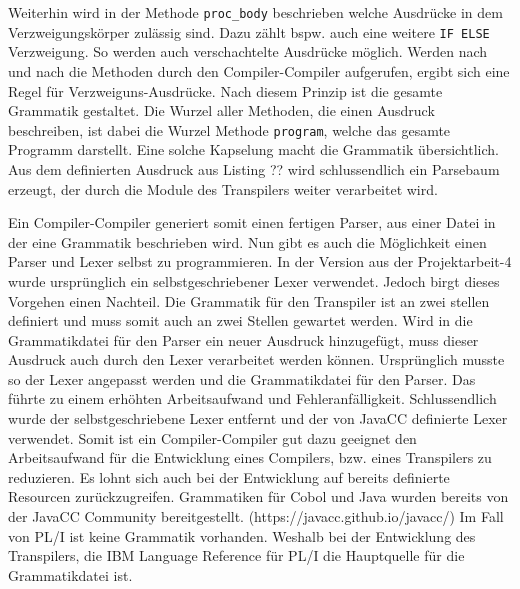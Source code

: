 Weiterhin wird in der Methode \verb+proc_body+ beschrieben welche Ausdrücke in dem Verzweigungskörper zulässig sind. Dazu zählt bspw. auch eine weitere \verb+IF ELSE+ Verzweigung. So werden auch verschachtelte Ausdrücke möglich.
Werden nach und nach die Methoden durch den Compiler-Compiler aufgerufen, ergibt sich eine Regel für Verzweiguns-Ausdrücke. Nach diesem Prinzip ist die gesamte Grammatik gestaltet. 
Die Wurzel aller Methoden, die einen Ausdruck beschreiben, ist dabei die Wurzel Methode \verb+program+, welche das gesamte Programm darstellt. Eine solche Kapselung macht die Grammatik übersichtlich.
Aus dem definierten Ausdruck aus Listing ?? wird schlussendlich ein Parsebaum erzeugt, der durch die Module des Transpilers weiter verarbeitet wird.


Ein Compiler-Compiler generiert somit einen fertigen Parser, aus einer Datei in der eine Grammatik beschrieben wird. Nun gibt es auch die Möglichkeit einen Parser und Lexer selbst zu programmieren. In der Version aus der Projektarbeit-4 wurde ursprünglich ein selbstgeschriebener Lexer verwendet.
Jedoch birgt dieses Vorgehen einen Nachteil. Die Grammatik für den Transpiler ist an zwei stellen definiert und muss somit auch an zwei Stellen gewartet werden.
Wird in die Grammatikdatei für den Parser ein neuer Ausdruck hinzugefügt, muss dieser Ausdruck auch durch den Lexer verarbeitet werden können.
Ursprünglich musste so der Lexer angepasst werden und die Grammatikdatei für den Parser. 
Das führte zu einem erhöhten Arbeitsaufwand und Fehleranfälligkeit. Schlussendlich wurde der selbstgeschriebene Lexer entfernt und der von JavaCC definierte Lexer verwendet.
Somit ist ein Compiler-Compiler gut dazu geeignet den Arbeitsaufwand für die Entwicklung eines Compilers, bzw. eines Transpilers zu reduzieren. 
Es lohnt sich auch bei der Entwicklung auf bereits definierte Resourcen zurückzugreifen. 
Grammatiken für Cobol und Java wurden bereits von der JavaCC Community bereitgestellt. (https://javacc.github.io/javacc/)
Im Fall von PL/I ist keine Grammatik vorhanden. Weshalb bei der Entwicklung des Transpilers, die IBM Language Reference für PL/I die Hauptquelle für die Grammatikdatei ist.   

